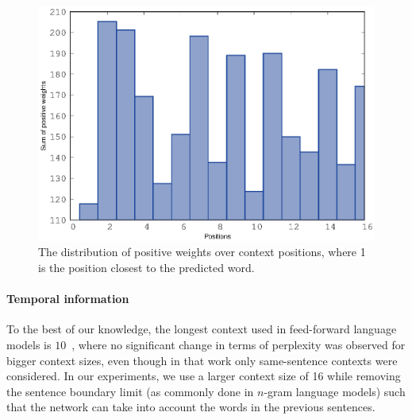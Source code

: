 \begin{figure}[t]
	\centering
	\includegraphics[width=\columnwidth]{figures/weight_dist.eps}
	\caption{The distribution of positive weights over context positions, where 1 is the position closest to the predicted word.}  
	\label{fig:weight-dist}
\end{figure}



\paragraph{Temporal information} To the best of our knowledge, the
longest context used in feed-forward language models is
$10$~\cite{hai2012measuring}, where no significant change in terms of
perplexity was observed for bigger context sizes, even though in that
work only same-sentence contexts were considered. In our experiments, we
use a larger context size of 16 while removing the sentence boundary limit
(as commonly done in $n$-gram language models) such that the network
can take into account the words in the previous sentences.

